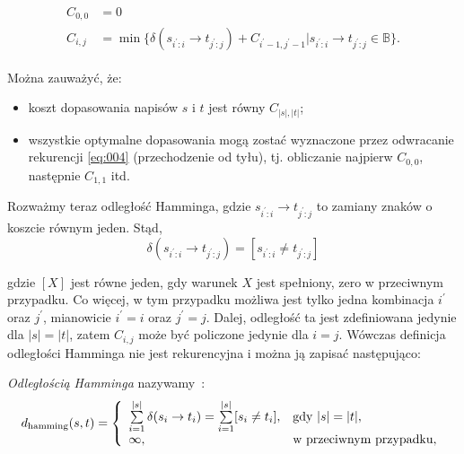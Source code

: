 \documentclass{praca1}
\begin{document}
\begin{align}
\begin{split}
\label{eq:004}
C_{0,0} &= 0 \\
C_{i,j} &= \min\{\delta(s_{i^\prime:i}\rightarrow t_{j^\prime:j}) + C_{i^\prime-1, j^\prime-1} | s_{i^\prime:i}\rightarrow t_{j^\prime:j} \in \mathbb{B}\}.
\end{split}
\end{align}

Można zauważyć, że:
\begin{itemize}
\item koszt dopasowania napisów $s$ i $t$ jest równy $C_{|s|, |t|}$;
\item wszystkie optymalne dopasowania mogą zostać wyznaczone przez odwracanie rekurencji \ref{eq:004} (przechodzenie od tyłu), tj. obliczanie najpierw $C_{0,0}$, następnie $C_{1,1}$ itd.
\end{itemize}




Rozważmy teraz odległość Hamminga, gdzie $s_{i^\prime:i}\rightarrow t_{j^\prime:j}$ to zamiany znaków o koszcie równym jeden. Stąd,
\begin{equation}
\label{eq:005}
\delta(s_{i^\prime:i}\rightarrow t_{j^\prime:j}) = [s_{i^\prime:i}\neq t_{j^\prime:j}]
\end{equation}

gdzie $[X]$ jest równe jeden, gdy warunek $X$ jest spełniony, zero w przeciwnym przypadku. Co więcej, w tym przypadku możliwa jest tylko jedna kombinacja $i^\prime$ oraz $j^\prime$, mianowicie $i^\prime = i$ oraz $j^\prime = j$. Dalej, odległość ta jest zdefiniowana jedynie dla $|s| = |t|$, zatem $C_{i,j}$ może być policzone jedynie dla $i = j$. Wówczas definicja odległości Hamminga nie jest rekurencyjna i można ją zapisać następująco:


\begin{definition}
\emph{Odległością Hamminga} nazywamy~\cite{Hamming1950:errordetecting}:
$$
d_{\mathrm{hamming}}(s, t) = \left\{
\begin{array}{l l}     
    \sum\limits_{i=1}^{|s|}\delta(s_i \rightarrow t_i) = \sum\limits_{i=1}^{|s|}[s_i\neq t_i], & \text{gdy } |s| = |t|,\\
    \infty, & \text{w przeciwnym przypadku},
\end{array}\right.
$$
\end{definition}
\end{document}
